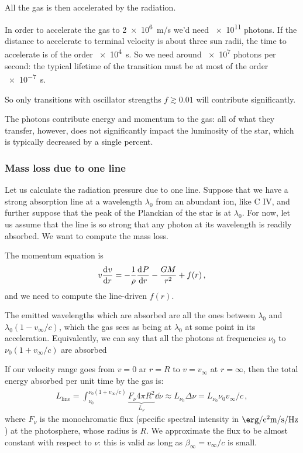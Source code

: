\documentclass[main.tex]{subfiles}
\begin{document}
All the gas is then accelerated by the radiation.

In order to accelerate the gas to \SI{2e6}{m/s} we'd need \num{e11} photons.
If the distance to accelerate to terminal velocity is about three sun radii, the time to accelerate is of the order \SI{e4}{s}.
So we need around \num{e7} photons per second: the typical lifetime of the transition must be at most of the order \SI{e-7}{s}.

So only transitions with oscillator strengths \(f \gtrsim 0.01\) will contribute significantly.


The photons contribute energy and momentum to the gas: all of what they transfer, however, does not significantly impact the luminosity of the star, which is typically decreased by a single percent.

\subsubsection{Mass loss due to one line}

Let us calculate the radiation pressure due to one line.
Suppose that we have a strong absorption line at a wavelength \(\lambda_0 \) from an abundant ion, like C IV, and further suppose that the peak of the Planckian of the star is at \(\lambda_0 \). 
For now, let us assume that the line is so strong that any photon at its wavelength is readily absorbed.
We want to compute the mass loss.

The momentum equation is 
%
\begin{align}
  v \dv[]{v}{r} = - \frac{1}{\rho } \dv[]{P}{r} - \frac{GM}{r^2} + f(r)
\,,
\end{align}
%
and we need to compute the line-driven \(f(r)\).

The emitted wavelengths which are absorbed are all the ones between \(\lambda_0\) and \(\lambda_0 (1 - v_{\infty}/c)\), which the gas sees as being at \(\lambda_0 \) at some point in its acceleration. Equivalently, we can say that all the photons at frequencies \(\nu_0 \) to \(\nu_0 (1+v_{ \infty } /c)\) are absorbed

If our velocity range goes from \(v=0\) ar \(r = R\) to \(v = v_{\infty}\) at \(r = \infty\), then the total energy absorbed per unit time by the gas is: 
%
\begin{align}
  L _{\text{line}} = \int _{\nu_0 }^{\nu_0 (1 + v_{\infty}/c)} \underbrace{F_\nu 4 \pi R^2}_{{L_{\nu}}} \dd{\nu } \approx L_{\nu_0 } \Delta \nu = L_{\nu_0 } \nu_0 v_{\infty} /c
\,,
\end{align}
%
where \(F_{\nu }\) is the monochromatic flux (specific spectral intensity in \(\SI{}{\erg\per\square\centi\metre\per\second\per\hertz}\)) at the photosphere, whose radius is \(R\).
We approximate the flux to be almost constant with respect to \(\nu \): this is valid as long as \(\beta_{ \infty } = v_{ \infty }/c\) is small.
\end{document}
